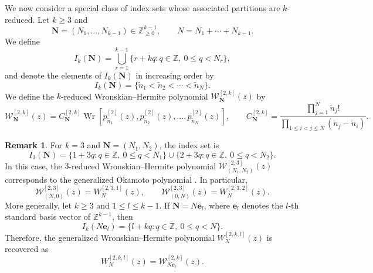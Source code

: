 \documentclass[preprint,3p,10pt]{elsarticle}
\theoremstyle{definition}
\newtheorem{remark}{Remark}[section]
\begin{document}
We now consider a special class of index sets whose associated
partitions are \(k\)-reduced. Let \(k\ge3\) and
\begin{equation}
    \mathbf N=(N_1,\ldots,N_{k-1})
    \in\mathbb Z_{\ge0}^{k-1},
    \qquad
    N=N_1+\cdots+N_{k-1}.
\end{equation}
We define
\begin{equation}
\label{eq:k-reduced-index-WH}
    I_k(\mathbf N)
    =
    \bigcup_{r=1}^{k-1}
    \{r+kq:q\in\mathbb Z,\ 0\le q<N_r\},
\end{equation}
and denote the elements of
\(I_k(\mathbf N)\) in increasing order by
\begin{equation}
    I_k(\mathbf N)
    =
    \{\tilde n_1<\tilde n_2<\cdots<\tilde n_N\}.
\end{equation}
We define the \(k\)-reduced Wronskian--Hermite polynomial $\mathcal W_{\mathbf N}^{[2,k]}(z)$ by
\begin{equation}
\label{eq:k-reduced-WH}
    \mathcal W_{\mathbf N}^{[2,k]}(z)
    =
    C_{\mathbf N}^{[2,k]}
    \operatorname{Wr}
    \left[
        p_{\tilde n_1}^{[2]}(z),
        p_{\tilde n_2}^{[2]}(z),
        \ldots,
        p_{\tilde n_N}^{[2]}(z)
    \right],
    \qquad
    C_{\mathbf N}^{[2,k]}
    =
    \frac{\prod_{j=1}^{N}\tilde n_j!}
    {\prod_{1\le i<j\le N}(\tilde n_j-\tilde n_i)} .
\end{equation}


\begin{remark}
For \(k=3\) and \(\mathbf N=(N_1,N_2)\), the index set is
\begin{equation}
    I_3(\mathbf N)
    =
    \{1+3q:q\in\mathbb Z,\ 0\le q<N_1\}
    \cup
    \{2+3q:q\in\mathbb Z,\ 0\le q<N_2\}.
\end{equation}
In this case, the \(3\)-reduced Wronskian--Hermite polynomial $\mathcal W_{(N_1,N_2)}^{[2,3]}(z)$
corresponds to the generalized Okamoto polynomial \cite{Yang2023Yang,clarkson2003fourth}.
In particular,
\begin{equation}
    \mathcal W_{(N,0)}^{[2,3]}(z)
    =
    W_N^{[2,3,1]}(z),
    \qquad
    \mathcal W_{(0,N)}^{[2,3]}(z)
    =
    W_N^{[2,3,2]}(z).
\end{equation}
More generally, let \(k\ge3\) and \(1\le l\le k-1\). If $\mathbf N=N\mathbf e_l$,
where \(\mathbf e_l\) denotes the \(l\)-th standard basis vector of
\(\mathbb Z^{k-1}\), then
\begin{equation}
    I_k(N\mathbf e_l)
    =
    \{l+kq:q\in\mathbb Z,\ 0\le q<N\}.
\end{equation}
Therefore, the generalized Wronskian--Hermite polynomial
\(W_N^{[2,k,l]}(z)\) is recovered as
\begin{equation}
\label{eq:single-block-recovery}
    W_N^{[2,k,l]}(z)
    =
    \mathcal W_{N\mathbf e_l}^{[2,k]}(z).
\end{equation}

\end{remark}
\end{document}
